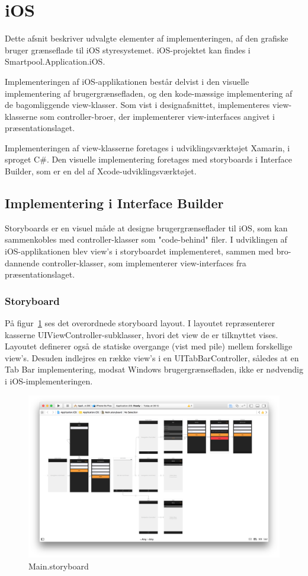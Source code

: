 \section{iOS}
Dette afsnit beskriver udvalgte elementer af implementeringen, af den grafiske bruger grænseflade til iOS styresystemet. iOS-projektet kan findes i Smartpool.Application.iOS.

Implementeringen af iOS-applikationen består delvist i den visuelle implementering af brugergrænsefladen, og den kode-mæssige implementering af de bagomliggende view-klasser. Som vist i designafsnittet, implementeres view-klasserne som controller-broer, der implementerer view-interfaces angivet i præsentationslaget.

Implementeringen af view-klasserne foretages i udviklingsværktøjet Xamarin, i sproget C\#. Den visuelle implementering foretages med storyboards i Interface Builder, som er en del af Xcode-udviklingsværktøjet.

\subsection{Implementering i Interface Builder}
Storyboards er en visuel måde at designe brugergrænseflader til iOS, som kan sammenkobles med controller-klasser som "code-behind" filer. I udviklingen af iOS-applikationen blev view's i storyboardet implementeret, sammen med bro-dannende controller-klasser, som implementerer view-interfaces fra præsentationslaget.

\subsubsection{Storyboard}
På figur~\ref{fig:iosstoryboard} ses det overordnede storyboard layout. I layoutet repræsenterer kasserne UIViewController-subklasser, hvori det view de er tilknyttet vises. Layoutet definerer også de statiske overgange (vist med pile) mellem forskellige view's. Desuden indlejres en række view's i en UITabBarController, således at en Tab Bar implementering, modsat Windows brugergrænsefladen, ikke er nødvendig i iOS-implementeringen.

\begin{figure}
	\centering
	\includegraphics[width=1.0\linewidth]{figs/implementering/ios_imp_storyboard}
	\caption{Main.storyboard}
	\label{fig:iosstoryboard}
\end{figure}

